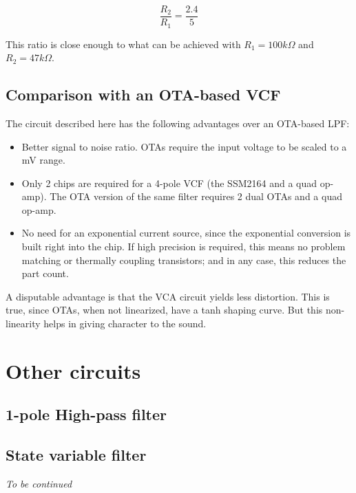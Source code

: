 \documentclass[a4paper,11pt]{article}
\begin{document}
$$\frac{R_2}{R_1} = \frac{2.4}{5}$$

This ratio is close enough to what can be achieved with $R_1 = 100 k\Omega$ and $R_2 = 47 k\Omega$.

\subsection{Comparison with an OTA-based VCF}

The circuit described here has the following advantages over an OTA-based LPF:

\begin{itemize}
\item Better signal to noise ratio. OTAs require the input voltage to be scaled to a mV range.
\item Only 2 chips are required for a 4-pole VCF (the SSM2164 and a quad op-amp). The OTA version of the same filter requires 2 dual OTAs and a quad op-amp.
\item No need for an exponential current source, since the exponential conversion is built right into the chip. If high precision is required, this means no problem matching or thermally coupling transistors; and in any case, this reduces the part count.
\end{itemize}

A disputable advantage is that the VCA circuit yields less distortion. This is true, since OTAs, when not linearized, have a tanh shaping curve. But this non-linearity helps in giving character to the sound.

\section{Other circuits}

\subsection{1-pole High-pass filter}

\subsection{State variable filter}

\textit{To be continued}
\end{document}
